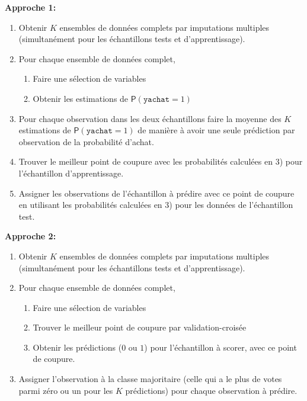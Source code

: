 \documentclass[
  11pt,
  letterpaper,
]{book}
\providecommand{\tightlist}{%
  \setlength{\itemsep}{0pt}\setlength{\parskip}{0pt}}
\theoremstyle{definition}
\theoremstyle{definition}
\theoremstyle{definition}
\theoremstyle{remark}
\begin{document}
\textbf{Approche 1: }

\begin{enumerate}
\def\labelenumi{\arabic{enumi})}
\tightlist
\item
  Obtenir \(K\) ensembles de données complets par imputations multiples (simultanément pour les échantillons tests et d'apprentissage).
\item
  Pour chaque ensemble de données complet,

  \begin{enumerate}
  \def\labelenumii{\alph{enumii}.}
  \tightlist
  \item
    Faire une sélection de variables
  \item
    Obtenir les estimations de \({\mathsf P}\left(\texttt{yachat}=1\right)\)
  \end{enumerate}
\item
  Pour chaque observation dans les deux échantillons faire la moyenne des \(K\) estimations de \({\mathsf P}\left(\texttt{yachat}=1\right)\) de manière à avoir une seule prédiction par observation de la probabilité d'achat.
\item
  Trouver le meilleur point de coupure avec les probabilités calculées en 3) pour l'échantillon d'apprentissage.
\item
  Assigner les observations de l'échantillon à prédire avec ce point de coupure en utilisant les probabilités calculées en 3) pour les données de l'échantillon test.
\end{enumerate}

\textbf{Approche 2:}

\begin{enumerate}
\def\labelenumi{\arabic{enumi})}
\tightlist
\item
  Obtenir \(K\) ensembles de données complets par imputations multiples (simultanément pour les échantillons tests et d'apprentissage).
\item
  Pour chaque ensemble de données complet,

  \begin{enumerate}
  \def\labelenumii{\alph{enumii}.}
  \tightlist
  \item
    Faire une sélection de variables
  \item
    Trouver le meilleur point de coupure par validation-croisée
  \item
    Obtenir les prédictions (\(0\) ou \(1\)) pour l'échantillon à scorer, avec ce point de coupure.
  \end{enumerate}
\item
  Assigner l'observation à la classe majoritaire (celle qui a le plus de votes parmi zéro ou un pour les \(K\) prédictions) pour chaque observation à prédire.
\end{enumerate}
\end{document}
